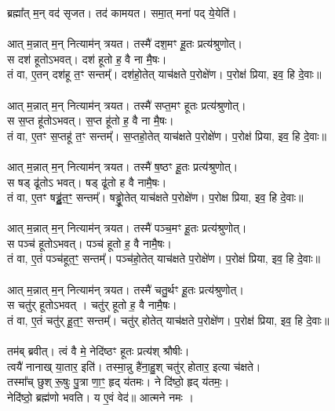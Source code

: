 \subsection{}
\\
ब्रह्मा᳚त् म॒न् वद॑ सृजत। तद॑ कामयत। समा॒त् मना॑ पद् ये॒येति॑। \\
\\
आत् म॒न्नात् म॒न् नित्याम॑न् त्रयत। तस्मै॑ दश॒मꣳ हू॒तः प्रत्य॑श्रुणोत्।\\
स दश॑ हूतोऽभवत्। दश॑ हूतो ह॒ वै ना मै॒षः। \\
तं वा, ए॒तन् दश॑हू त॒ꣳ सन्तम्᳚। दश॑हो॒तेत् याच॑क्षते प॒रोक्षे॑ण। प॒रोक्ष॑ प्रिया, इव॒ हि दे॒वाः॥\\
\\
आत् म॒न्नात् म॒न् नित्याम॑न् त्रयत। तस्मै॑ सप्त॒मꣳ हूतः प्रत्य॑श्रुणोत्। \\
स स॒प्त हू॑तोऽभवत्। स॒प्त हू॑तो ह॒ वै ना मै॒षः। \\
तं वा, ए॒तꣳ स॒प्तहू॑ त॒ꣳ सन्तम्᳚। स॒प्तहो॒तेत् याच॑क्षते प॒रोक्षे॑ण। प॒रोक्ष॑ प्रिया, इव॒ हि दे॒वाः॥\\
\\
आत् म॒न्नात् म॒न् नित्याम॑न् त्रयत। तस्मै॑ ष॒ष्ठꣳ हू॒तः प्रत्य॑श्रुणोत्। \\
स षड् ढू॑तोऽ भवत्। षड् ढू॑तो ह वै नामै॒षः। \\
तं वा, ए॒तꣳ षड्ढू॒॑त॒ꣳ॒ सन्तम्᳚। षड्ढूो॒तेत् याच॑क्षते प॒रोक्षे॑ण। प॒रोक्ष प्रिया, इव॒ हि दे॒वाः॥\\
\\
आत् म॒न्नात् म॒न् नित्याम॑न् त्रयत। तस्मै॑ पञ्च॒मꣳ हू॒तः प्रत्य॑श्रुणोत्। \\
स पञ्च॑ हूतोऽभवत्। पञ्च॑ हूतो ह॒ वै नामै॒षः। \\
तं वा, ए॒तं पञ्च॑हूत॒ꣳ॒ सन्तम्᳚। पञ्च॑हो॒तेत् याच॑क्षते प॒रोक्षे॑ण। प॒रोक्ष॑ प्रिया, इव॒ हि दे॒वाः॥\\
\\
आत् म॒न्नात् म॒न् नित्याम॑न् त्रयत। तस्मै॑ चतु॒र्थꣳ हू॒तः प्रत्य॑श्रुणोत्। \\
स चतु॑र् हूतोऽभवत् । चतु॑र् हूतो ह॒ वै नामै॒षः। \\
तं वा,  ए॒तं चतु॑र् हू॒त॒ꣳ॒ सन्तम्᳚। चतु॑र् होतेत् याच॑क्षते प॒रोक्षे॑ण। प॒रोक्ष॑ प्रिया, इव॒ हि दे॒वाः॥\\
\\
तम॑ब् ब्रवीत्। त्वं वै मे॒ नेदि॑ष्ठꣳ हूतः प्रत्य॑श् श्रौषीः। \\
त्वयै॑ नानाख् या॒तार॒ इति॑। तस्मा॒न्नु है॑ना॒हु॒श् चतु॑र् होतार॒ इत्या च॑क्षते। \\
तस्मा᳚च् छुश् रू॒षुः पु॒त्रा णा॒ꣳ॒ हृद् य॑तमः। ने दि॑ष्ठो॒ हृद् य॑तमः॒।\\
नेदि॑ष्ठो॒ ब्रह्म॑णो भवति। य ए॒वं वेद॑॥ आत्मने नमः ।\\
\\
